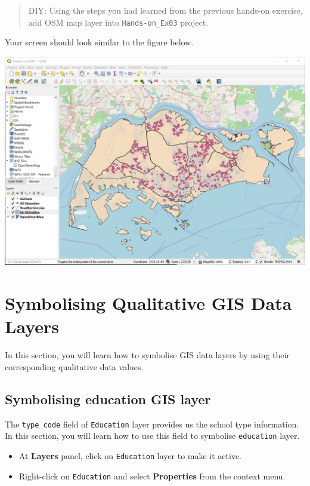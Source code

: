\documentclass[
  letterpaper,
  DIV=11,
  numbers=noendperiod]{scrreprt}
\providecommand{\tightlist}{%
  \setlength{\itemsep}{0pt}\setlength{\parskip}{0pt}}\usepackage{longtable,booktabs,array}
\begin{document}
\begin{quote}
DIY: Using the steps you had learned from the previous hands-on
exercise, add OSM map layer into \texttt{Hands-on\_Ex03} project.
\end{quote}

Your screen should look similar to the figure below.

\includegraphics{./img03/image1.jpg}

\hypertarget{symbolising-qualitative-gis-data-layers}{%
\section{Symbolising Qualitative GIS Data
Layers}\label{symbolising-qualitative-gis-data-layers}}

In this section, you will learn how to symbolise GIS data layers by
using their corresponding qualitative data values.

\hypertarget{symbolising-education-gis-layer}{%
\subsection{Symbolising education GIS
layer}\label{symbolising-education-gis-layer}}

The \texttt{type\_code} field of \texttt{Education} layer provides us
the school type information. In this section, you will learn how to use
this field to symbolise \texttt{education} layer.

\begin{itemize}
\tightlist
\item
  At \textbf{Layers} panel, click on \texttt{Education} layer to make it
  active.
\item
  Right-click on \texttt{Education} and select \textbf{Properties} from
  the context menu.
\end{itemize}
\end{document}
